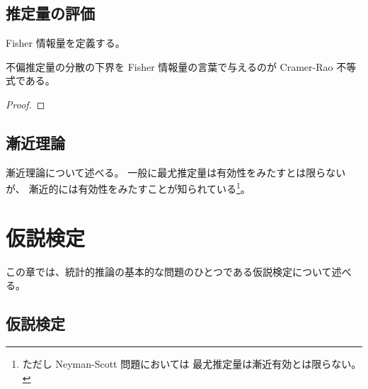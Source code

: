 \documentclass[report]{jlreq}
\begin{document}
\begin{definition}
    \TODO{}
\end{definition}

%
\section{推定量の評価}

\begin{definition}[スコア関数]
    \TODO{}
\end{definition}

Fisher 情報量を定義する。

\begin{definition}
    \TODO{}
\end{definition}

不偏推定量の分散の下界を Fisher 情報量の言葉で与えるのが Cramer-Rao 不等式である。

\begin{proposition}
    \TODO{}
\end{proposition}

\begin{proof}
    \TODO{}
\end{proof}

\begin{definition}[有効性]
    \TODO{}
\end{definition}

%
\section{漸近理論}

漸近理論について述べる。
一般に最尤推定量は有効性をみたすとは限らないが、
漸近的には有効性をみたすことが知られている\footnote{
    ただし Neyman-Scott 問題においては
    最尤推定量は漸近有効とは限らない。
}。

\TODO{}



%
\chapter{仮説検定}

この章では、統計的推論の基本的な問題のひとつである仮説検定について述べる。

%
\section{仮説検定}

\TODO{}
\end{document}
